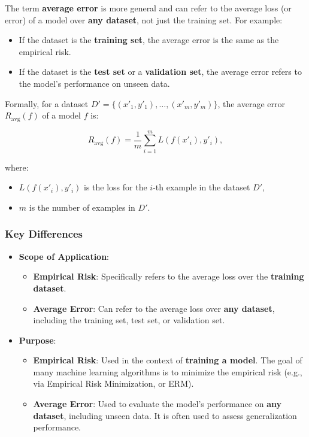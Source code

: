 \begin{notechapter}
The term \textbf{average error} is more general and can refer to the average loss (or error) of a model over \textbf{any dataset}, not just the training set. For example:
\begin{itemize}
    \item If the dataset is the \textbf{training set}, the average error is the same as the empirical risk.
    \item If the dataset is the \textbf{test set} or a \textbf{validation set}, the average error refers to the model's performance on unseen data.
\end{itemize}

Formally, for a dataset \( D' = \{(x'_1, y'_1), \dots, (x'_m, y'_m)\} \), the average error \( R_{\text{avg}}(f) \) of a model \( f \) is:

\[
R_{\text{avg}}(f) = \frac{1}{m} \sum_{i=1}^m L(f(x'_i), y'_i),
\]

where:
\begin{itemize}
    \item \( L(f(x'_i), y'_i) \) is the loss for the \( i \)-th example in the dataset \( D' \),
    \item \( m \) is the number of examples in \( D' \).
\end{itemize}

\subsubsection{Key Differences}

\begin{itemize}
    \item \textbf{Scope of Application}:
        \begin{itemize}
            \item \textbf{Empirical Risk}: Specifically refers to the average loss over the \textbf{training dataset}.
            \item \textbf{Average Error}: Can refer to the average loss over \textbf{any dataset}, including the training set, test set, or validation set.
        \end{itemize}

    \item \textbf{Purpose}:
        \begin{itemize}
            \item \textbf{Empirical Risk}: Used in the context of \textbf{training a model}. The goal of many machine learning algorithms is to minimize the empirical risk (e.g., via Empirical Risk Minimization, or ERM).
            \item \textbf{Average Error}: Used to evaluate the model's performance on \textbf{any dataset}, including unseen data. It is often used to assess generalization performance.
        \end{itemize}


\end{itemize}
\end{notechapter}

